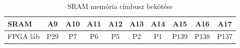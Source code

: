 \begin{table}[H]
\begin{tabular}{|lccccccccc|}
			\multicolumn{1}{|l|}{SRAM}                                                    & \multicolumn{1}{c|}{A9}                                                 & \multicolumn{1}{c|}{A10}                                                & \multicolumn{1}{c|}{A11}                                                & \multicolumn{1}{c|}{A12}                                                & \multicolumn{1}{c|}{A13}                                                & \multicolumn{1}{c|}{A14}                                                & \multicolumn{1}{c|}{A15}                                                & \multicolumn{1}{c|}{A16}                                                & A17  \\ \hline
			\multicolumn{1}{|l|}{FPGA láb}                                                & \multicolumn{1}{c|}{P29}                                                & \multicolumn{1}{c|}{P7}                                                 & \multicolumn{1}{c|}{P6}                                                 & \multicolumn{1}{c|}{P5}                                                 & \multicolumn{1}{c|}{P2}                                                 & \multicolumn{1}{c|}{P1}                                                 & \multicolumn{1}{c|}{P139}                                               & \multicolumn{1}{c|}{P138}                                               & P137 \\ \hline
		\end{tabular}
		\caption{SRAM memória címbusz bekötése}
		\label{tab:FPGA-MEM-SRAMpin}
	\end{table}
		
